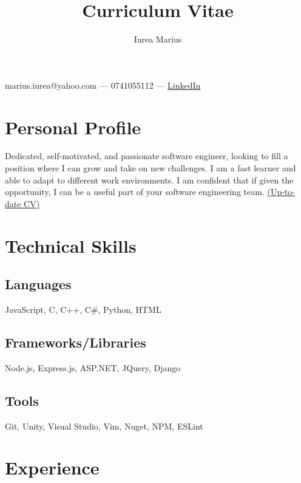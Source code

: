 \documentclass[a4paper,hidelinks,11pt]{article}
\begin{document}
\title{Curriculum Vitae}
\author{Iurea Marius}
\renewcommand{\maketitle}
{
        \begin{center}
        {\huge\bfseries
        \thetitle

        \theauthor}

        marius.iurea@yahoo.com --- 0741055112 --- \href{https://www.linkedin.com/in/marius-iurea-49b7021b5/}{LinkedIn}

        \end{center}
}

\maketitle

\section{Personal Profile}
Dedicated, self-motivated, and passionate software engineer, looking to fill a position where I can grow and take on new
challenges. I am a fast learner and able to adapt to different work environments. I am confident that if given the opportunity, I can be a useful part of your software engineering team. \href{https://github.com/IureaMarius/CV}{(Up-to-date CV)}



\section{Technical Skills}
\subsection{Languages}
JavaScript, C, C++, C\#, Python, HTML
\subsection{Frameworks/Libraries}
Node.js, Express.js, ASP.NET, JQuery, Django
\subsection{Tools}
Git, Unity, Visual Studio, Vim, Nuget, NPM, ESLint

\section{Experience}
\end{document}
